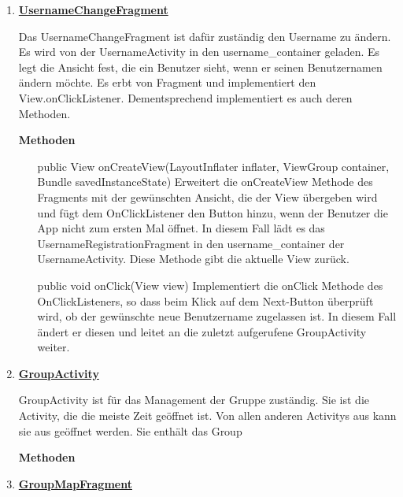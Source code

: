\begin{enumerate}
	\item \textbf{\underline{UsernameChangeFragment}}
		
	Das UsernameChangeFragment ist dafür zuständig den Username zu ändern. Es wird von der UsernameActivity in den username\_container geladen. Es legt die Ansicht fest, die ein Benutzer sieht, wenn er seinen Benutzernamen ändern möchte. Es erbt von Fragment und implementiert den View.onClickListener. Dementsprechend implementiert es auch deren Methoden.
	
	\textbf{Methoden}
	
	\begin{enumerate}
		\item[public View onCreateView(LayoutInflater inflater, ViewGroup container, Bundle savedInstanceState)]
		Erweitert die onCreateView Methode des Fragments mit der gewünschten Ansicht, die der View übergeben wird und fügt dem OnClickListener den Button hinzu, wenn der Benutzer die App nicht zum ersten Mal öffnet. In diesem Fall lädt es das UsernameRegistrationFragment in den username\_container der UsernameActivity. Diese Methode gibt die aktuelle View zurück.
		\item[public void onClick(View view)]
		Implementiert die onClick Methode des OnClickListeners, so dass beim Klick auf dem Next-Button überprüft wird, ob der gewünschte neue Benutzername zugelassen ist. In diesem Fall ändert er diesen und leitet an die zuletzt aufgerufene GroupActivity weiter.
	\end{enumerate}
	
	\item \textbf{\underline{GroupActivity}}
	
	GroupActivity ist für das Management der Gruppe zuständig. Sie ist die Activity, die die meiste Zeit geöffnet ist. Von allen anderen Activitys aus kann sie aus geöffnet werden. Sie enthält das Group
	
	\textbf{Methoden}
	
	\begin{enumerate}
		\item[]
		
	\end{enumerate}
	
	\item \textbf{\underline{GroupMapFragment}}
	

\end{enumerate}
